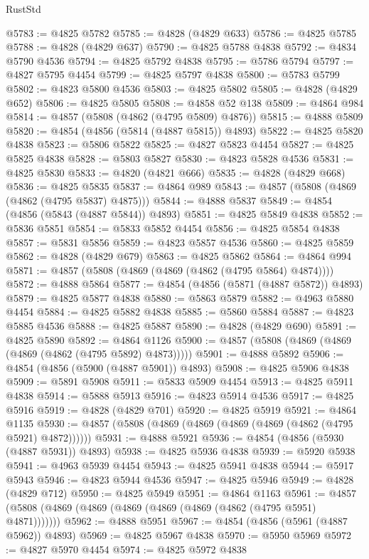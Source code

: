 \begin{lexlean}{RustStd}
\begin{coremodule}
{\begin{coremodule}
{{{{{{{{{{{{{{{{{{{{{{{{{{{{{{{{{{{{{{{{{{{{{{{{{{{{{{{{{{{{{{{{{{{{{{{{{{{{{{{{@5783 := @4825 @5782
@5785 := @4828 (@4829 @633)
@5786 := @4825 @5785
@5788 := @4828 (@4829 @637)
@5790 := @4825 @5788 @4838
@5792 := @4834 @5790 @4536
@5794 := @4825 @5792 @4838
@5795 := @5786 @5794
@5797 := @4827 @5795 @4454
@5799 := @4825 @5797 @4838
@5800 := @5783 @5799
@5802 := @4823 @5800 @4536
@5803 := @4825 @5802
@5805 := @4828 (@4829 @652)
@5806 := @4825 @5805
@5808 := @4858 @52 @138
@5809 := @4864 @984
@5814 := @4857 (@5808 (@4862 (@4795 @5809) @4876))
@5815 := @4888 @5809
@5820 := @4854 (@4856 (@5814 (@4887 @5815)) @4893)
@5822 := @4825 @5820 @4838
@5823 := @5806 @5822
@5825 := @4827 @5823 @4454
@5827 := @4825 @5825 @4838
@5828 := @5803 @5827
@5830 := @4823 @5828 @4536
@5831 := @4825 @5830
@5833 := @4820 (@4821 @666)
@5835 := @4828 (@4829 @668)
@5836 := @4825 @5835
@5837 := @4864 @989
@5843 := @4857 (@5808 (@4869 (@4862 (@4795 @5837) @4875)))
@5844 := @4888 @5837
@5849 := @4854 (@4856 (@5843 (@4887 @5844)) @4893)
@5851 := @4825 @5849 @4838
@5852 := @5836 @5851
@5854 := @5833 @5852 @4454
@5856 := @4825 @5854 @4838
@5857 := @5831 @5856
@5859 := @4823 @5857 @4536
@5860 := @4825 @5859
@5862 := @4828 (@4829 @679)
@5863 := @4825 @5862
@5864 := @4864 @994
@5871 := @4857 (@5808 (@4869 (@4869 (@4862 (@4795 @5864) @4874))))
@5872 := @4888 @5864
@5877 := @4854 (@4856 (@5871 (@4887 @5872)) @4893)
@5879 := @4825 @5877 @4838
@5880 := @5863 @5879
@5882 := @4963 @5880 @4454
@5884 := @4825 @5882 @4838
@5885 := @5860 @5884
@5887 := @4823 @5885 @4536
@5888 := @4825 @5887
@5890 := @4828 (@4829 @690)
@5891 := @4825 @5890
@5892 := @4864 @1126
@5900 := @4857 (@5808 (@4869 (@4869 (@4869 (@4862 (@4795 @5892) @4873)))))
@5901 := @4888 @5892
@5906 := @4854 (@4856 (@5900 (@4887 @5901)) @4893)
@5908 := @4825 @5906 @4838
@5909 := @5891 @5908
@5911 := @5833 @5909 @4454
@5913 := @4825 @5911 @4838
@5914 := @5888 @5913
@5916 := @4823 @5914 @4536
@5917 := @4825 @5916
@5919 := @4828 (@4829 @701)
@5920 := @4825 @5919
@5921 := @4864 @1135
@5930 := @4857 (@5808 (@4869 (@4869 (@4869 (@4869 (@4862 (@4795 @5921) @4872))))))
@5931 := @4888 @5921
@5936 := @4854 (@4856 (@5930 (@4887 @5931)) @4893)
@5938 := @4825 @5936 @4838
@5939 := @5920 @5938
@5941 := @4963 @5939 @4454
@5943 := @4825 @5941 @4838
@5944 := @5917 @5943
@5946 := @4823 @5944 @4536
@5947 := @4825 @5946
@5949 := @4828 (@4829 @712)
@5950 := @4825 @5949
@5951 := @4864 @1163
@5961 := @4857 (@5808 (@4869 (@4869 (@4869 (@4869 (@4869 (@4862 (@4795 @5951) @4871)))))))
@5962 := @4888 @5951
@5967 := @4854 (@4856 (@5961 (@4887 @5962)) @4893)
@5969 := @4825 @5967 @4838
@5970 := @5950 @5969
@5972 := @4827 @5970 @4454
@5974 := @4825 @5972 @4838
}}}}}}}}}}}}}}}}}}}}}}}}}}}}}}}}}}}}}}}}}}}}}}}}}}}}}}}}}}}}}}}}}}}}}}}}}}}}}}}}
\end{coremodule}}
\end{coremodule}
\end{lexlean}

